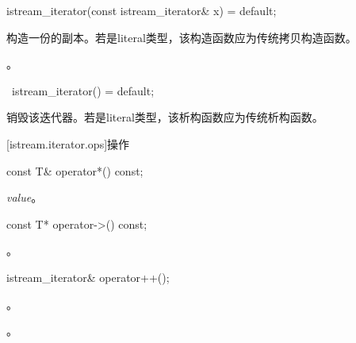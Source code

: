 %
\begin{itemdecl}
istream_iterator(const istream_iterator& x) = default;
\end{itemdecl}

\begin{itemdescr}
\pnum
\effects
构造一份的副本。若是literal类型，该构造函数应为传统拷贝构造函数。

\pnum
\postcondition {}。
\end{itemdescr}

%
\begin{itemdecl}
~istream_iterator() = default;
\end{itemdecl}

\begin{itemdescr}
\pnum
\effects
销毁该迭代器。若是literal类型，该析构函数应为传统析构函数。
\end{itemdescr}

[istream.iterator.ops]{操作}

%
%
\begin{itemdecl}
const T& operator*() const;
\end{itemdecl}

\begin{itemdescr}
\pnum
\returns
\textit{value}。
\end{itemdescr}

%
%
\begin{itemdecl}
const T* operator->() const;
\end{itemdecl}

\begin{itemdescr}
\pnum
\returns
{}。
\end{itemdescr}

%
%
\begin{itemdecl}
istream_iterator& operator++();
\end{itemdecl}

\begin{itemdescr}
\pnum
\requires {}。

\pnum
\effects
{}

\pnum
\returns
{}。
\end{itemdescr}


